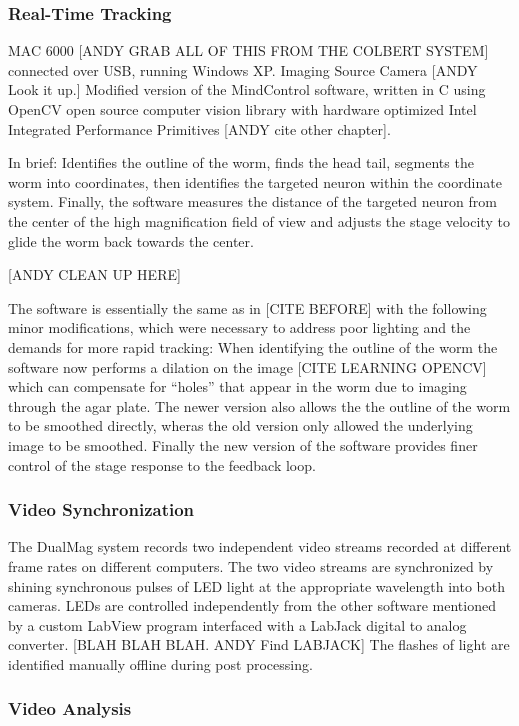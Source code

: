 \subsubsection{Real-Time Tracking} \label{sec:omegaSoftware}
MAC 6000 [ANDY GRAB ALL OF THIS FROM THE COLBERT SYSTEM] connected over USB, running Windows XP. 
Imaging Source Camera [ANDY Look it up.]
Modified version of the MindControl software, written in C using OpenCV open source computer vision library with hardware optimized Intel Integrated Performance Primitives [ANDY cite other chapter]. 

In brief:
Identifies the outline of the worm, finds the head tail, segments the worm into coordinates, then identifies the targeted neuron within the coordinate system. Finally, the software measures the distance of the targeted neuron from the center of the high magnification field of view and adjusts the stage velocity to glide the worm back towards the center. 

[ANDY CLEAN UP HERE]


The software is essentially the same as in [CITE BEFORE] with the following minor modifications, which were necessary to address poor lighting and the demands for more rapid tracking: When identifying the outline of the worm the software now performs a dilation on the image [CITE LEARNING OPENCV] which can compensate for ``holes'' that appear in the worm due to imaging through the agar plate. The newer version also allows the the outline of the worm to be smoothed directly, wheras the old version only allowed the underlying image to be smoothed. Finally the new version of the software provides finer control of the stage response to the feedback loop. 




\subsubsection{Video Synchronization}
The DualMag system records two independent video streams recorded at different frame rates on different computers. The two video streams are synchronized by shining synchronous pulses of LED light at the appropriate wavelength into both cameras. LEDs are controlled independently from the other software mentioned by a custom LabView program  interfaced with a LabJack digital to analog converter. [BLAH BLAH BLAH. ANDY Find LABJACK] The flashes of light are identified manually offline during post processing. 

\subsubsection{Video Analysis}





